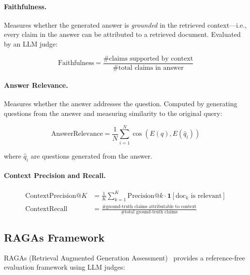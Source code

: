 \paragraph{Faithfulness.}
\label{faithfulness.}

Measures whether the generated answer is \emph{grounded} in the retrieved context---i.e., every claim in the answer can be attributed to a retrieved document. Evaluated by an LLM judge:

\begin{equation}
  \text{Faithfulness} = \frac{\text{\# claims supported by context}}{\text{\# total claims in answer}}
\end{equation}

\paragraph{Answer Relevance.}
\label{answer-relevance.}

Measures whether the answer addresses the question. Computed by generating questions from the answer and measuring similarity to the original query:

\begin{equation}
  \text{AnswerRelevance} = \frac{1}{N} \sum_{i=1}^{N} \cos\!\left(E(q), E(\hat{q}_i)\right)
\end{equation}

where $\hat{q}_i$ are questions generated from the answer.

\paragraph{Context Precision and Recall.}
\label{context-precision-and-recall.}

\begin{align}
  \text{ContextPrecision@}K &= \frac{1}{K} \sum_{k=1}^{K} \text{Precision@}k \cdot \mathbf{1}[\text{doc}_k \text{ is relevant}] \\
  \text{ContextRecall} &= \frac{\text{\# ground-truth claims attributable to context}}{\text{\# total ground-truth claims}}
\end{align}

\subsection{RAGAs Framework}
\label{ragas-framework}

RAGAs (Retrieval Augmented Generation Assessment)~\cite{es2023ragas} provides a reference-free evaluation framework using LLM judges:

